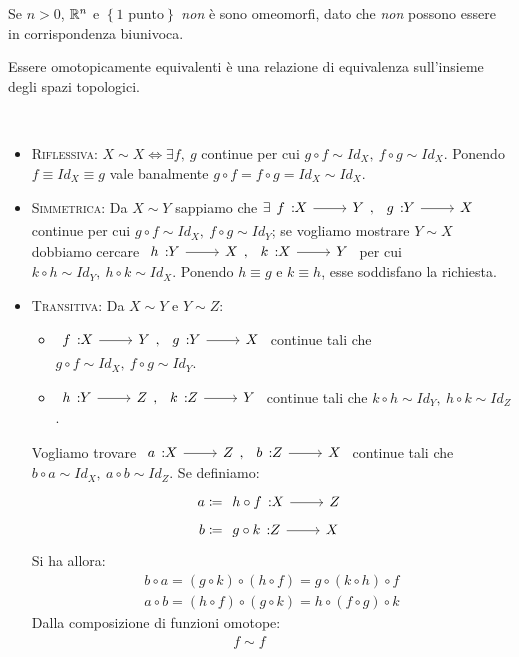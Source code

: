 \begin{attention}
	Se $n>0$, $\mathbb{R}^n$ e $\left\{1\text{ punto}\right\}$ \textit{non} è sono omeomorfi, dato che \textit{non} possono essere in corrispondenza biunivoca.
\end{attention}
\begin{exercise}
	Essere omotopicamente equivalenti è una relazione di equivalenza sull'insieme degli spazi topologici.
\end{exercise}
\begin{demonstration}~{}
	\begin{itemize}
	\item \textsc{Riflessiva}: $X\sim X\iff \exists f,\ g$ continue per cui $g\circ f\sim Id_X,\ f\circ g\sim Id_X$. Ponendo $f\equiv Id_X\equiv g$ vale banalmente $g\circ f=f\circ g=Id_X\sim Id_X$.
	\item \textsc{Simmetrica}: Da $X\sim Y$ sappiamo che $\exists \funz{f}{X}{Y},\ \funz{g}{Y}{X}$ continue per cui $g\circ f\sim Id_X,\ f\circ g\sim Id_Y$; se vogliamo mostrare $Y\sim X$ dobbiamo cercare $\funz{h}{Y}{X},\ \funz{k}{X}{Y}$ per cui $k\circ h\sim Id_Y,\ h\circ k\sim Id_X$. Ponendo $h\equiv g$ e $k\equiv h$, esse soddisfano la richiesta.  
	\item \textsc{Transitiva}: Da $X\sim Y$ e $Y\sim Z$:
	\begin{itemize}
		\item $\funz{f}{X}{Y},\ \funz{g}{Y}{X}$ continue tali che $g\circ f\sim Id_X,\ f\circ g\sim Id_Y$.
			\item $\funz{h}{Y}{Z},\ \funz{k}{Z}{Y}$ continue tali che $k\circ h\sim Id_Y,\ h\circ k\sim Id_Z$.
	\end{itemize}
	Vogliamo trovare $\funz{a}{X}{Z},\ \funz{b}{Z}{X}$ continue tali che $b\circ a\sim Id_X,\ a\circ b\sim Id_Z$. Se definiamo:
	\begin{gather*}
		a\coloneqq \funz{h\circ f}{X}{Z}\\
		b\coloneqq \funz{g\circ k}{Z}{X}
	\end{gather*}
	Si ha allora:
	\begin{gather*}
		b\circ a=\left(g\circ k\right)\circ\left(h\circ f\right)=g\circ \left(k\circ h\right)\circ f\\
		a\circ b=\left(h\circ f\right)\circ \left(g\circ k\right)=h\circ\left(f\circ g\right)\circ k
	\end{gather*}
	Dalla composizione di funzioni omotope:
	\begin{equation*}
		\begin{array}{cccccc}
			f\sim f & & & &\\

\end{array}
\end{equation*}
\end{itemize}
\end{demonstration}
